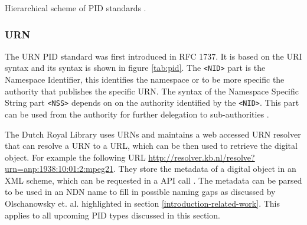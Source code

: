 
\begin {table}[H]
\caption {Hierarchical scheme of PID standards \cite{icn-bd}.} \label{tab:pid} 
\begin{center}
\end{center}
\end {table}



\subsubsection{URN}
The URN PID standard was first introduced in RFC 1737. It is based on the URI syntax and its syntax is shown in figure \ref{tab:pid}. The \texttt{\textless NID\textgreater} part is the Namespace Identifier, this identifies the namespace or to be more specific the authority that publishes the specific URN.
The syntax of the Namespace Specific String part \texttt{\textless NSS\textgreater} depends on on the authority identified by the \texttt{\textless NID\textgreater}. This part can be used from the authority for further delegation to sub-authorities \cite{icn-bd}.

The Dutch Royal Library uses URNs and maintains a web accessed URN resolver that can resolve a URN to a URL, which can be then used to retrieve the digital object. For example the following URL \url{http://resolver.kb.nl/resolve?urn=anp:1938:10:01:2:mpeg21}. 
They store the metadata of a digital object in an XML scheme, which can be requested in a API call \cite{kb-urn}. The metadata can be parsed to be used in an NDN name to fill in possible naming gaps as discussed by Olschanowsky et. al. \cite{ndn-clim} highlighted in section \ref{introduction-related-work}. This applies to all upcoming PID types discussed in this section.

